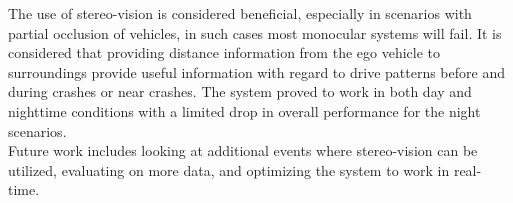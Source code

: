 The use of stereo-vision is considered beneficial, especially in scenarios with partial occlusion of vehicles, in such cases most monocular systems will fail. It is considered that providing distance information from the ego vehicle to surroundings provide useful information with regard to drive patterns before and during crashes or near crashes. The system proved to work in both day and nighttime conditions with a limited drop in overall performance for the night scenarios.\\
Future work includes looking at additional events where stereo-vision can be utilized, evaluating on more data, and optimizing the system to work in real-time.

\vspace{2pt}